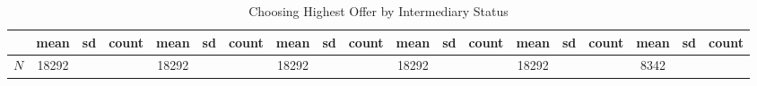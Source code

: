\begin{table}[htbp]\centering
\def\sym#1{\ifmmode^{#1}\else\(^{#1}\)\fi}
\caption{Choosing Highest Offer by Intermediary Status}
\begin{tabular}{l*{6}{ccc}}
\hline\hline
            &        mean&          sd&       count&        mean&          sd&       count&        mean&          sd&       count&        mean&          sd&       count&        mean&          sd&       count&        mean&          sd&       count\\
\hline
\hline
\(N\)       &       18292&            &            &       18292&            &            &       18292&            &            &       18292&            &            &       18292&            &            &        8342&            &            \\
\hline\hline
\end{tabular}
\end{table}
